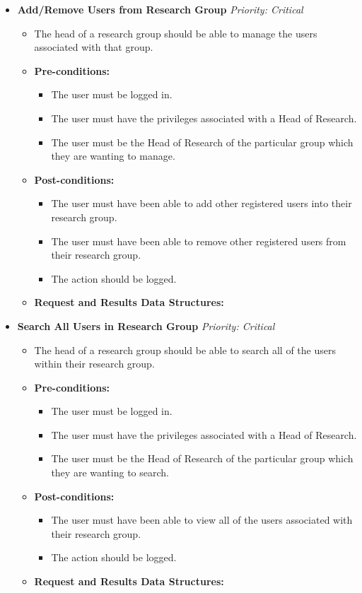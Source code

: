 \documentclass{article}
\begin{document}
				\begin{itemize}
					\item \textbf{Add/Remove Users from Research Group} \hfill \textit{Priority: Critical}
					\begin{itemize}
						\item The head of a research group should be able to manage the users associated with that group.
						\item \textbf{Pre-conditions:}
						\begin{itemize}
							\item The user must be logged in.
							\item The user must have the privileges associated with a Head of Research.
							\item The user must be the Head of Research of the particular group which they are wanting to manage.
						\end{itemize}
						\item \textbf{Post-conditions:}
						\begin{itemize}
							\item The user must have been able to add other registered users into their research group.
							\item The user must have been able to remove other registered users from their research group.
							\item The action should be logged.
						\end{itemize}
						\item \textbf{Request and Results Data Structures:}
					\end{itemize}
					
					\item \textbf{Search All Users in Research Group} \hfill \textit{Priority: Critical}
					\begin{itemize}
						\item The head of a research group should be able to search all of the users within their research group.
						\item \textbf{Pre-conditions:}
						\begin{itemize}
							\item The user must be logged in.
							\item The user must have the privileges associated with a Head of Research.
							\item The user must be the Head of Research of the particular group which they are wanting to search.
						\end{itemize}
						\item \textbf{Post-conditions:}
						\begin{itemize}
							\item The user must have been able to view all of the users associated with their research group.
							\item The action should be logged.
						\end{itemize}
						\item \textbf{Request and Results Data Structures:}
					\end{itemize}
					

\end{itemize}
\end{document}

